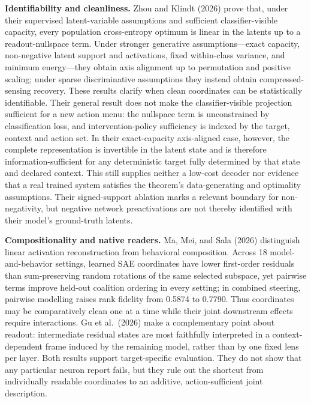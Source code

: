 \documentclass[
  british,
  11pt,
  a4paper,
]{article}
\begin{document}
\textbf{Identifiability and cleanliness.} Zhou and Klindt (2026) prove
that, under their supervised latent-variable assumptions and sufficient
classifier-visible capacity, every population cross-entropy optimum is
linear in the latents up to a readout-nullspace term. Under stronger
generative assumptions---exact capacity, non-negative latent support and
activations, fixed within-class variance, and minimum energy---they
obtain axis alignment up to permutation and positive scaling; under
sparse discriminative assumptions they instead obtain compressed-sensing
recovery. These results clarify when clean coordinates can be
statistically identifiable. Their general result does not make the
classifier-visible projection sufficient for a new action menu: the
nullspace term is unconstrained by classification loss, and
intervention-policy sufficiency is indexed by the target, context and
action set. In their exact-capacity axis-aligned case, however, the
complete representation is invertible in the latent state and is
therefore information-sufficient for any deterministic target fully
determined by that state and declared context. This still supplies
neither a low-cost decoder nor evidence that a real trained system
satisfies the theorem's data-generating and optimality assumptions.
Their signed-support ablation marks a relevant boundary for
non-negativity, but negative network preactivations are not thereby
identified with their model's ground-truth latents.

\textbf{Compositionality and native readers.} Ma, Mei, and Sala (2026)
distinguish linear activation reconstruction from behavioral
composition. Across 18 model-and-behavior settings, learned SAE
coordinates have lower first-order residuals than sum-preserving random
rotations of the same selected subspace, yet pairwise terms improve
held-out coalition ordering in every setting; in combined steering,
pairwise modelling raises rank fidelity from 0.5874 to 0.7790. Thus
coordinates may be comparatively clean one at a time while their joint
downstream effects require interactions. Gu et al.~(2026) make a
complementary point about readout: intermediate residual states are most
faithfully interpreted in a context-dependent frame induced by the
remaining model, rather than by one fixed lens per layer. Both results
support target-specific evaluation. They do not show that any particular
neuron report fails, but they rule out the shortcut from individually
readable coordinates to an additive, action-sufficient joint
description.
\end{document}
